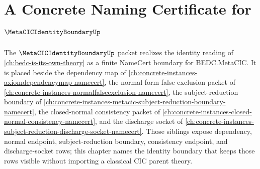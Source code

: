 \chapter{A Concrete Naming Certificate for $\MetaCICIdentityBoundaryUp$}
\label{ch:concrete-instances-metacicidentityboundary-namecert}

The $\MetaCICIdentityBoundaryUp$ packet realizes the identity reading of \autoref{ch:bedc-is-its-own-theory} as a finite NameCert boundary for BEDC.MetaCIC. It is placed beside the dependency map of \autoref{ch:concrete-instances-axiomdependencymap-namecert}, the normal-form false exclusion packet of \autoref{ch:concrete-instances-normalfalseexclusion-namecert}, the subject-reduction boundary of \autoref{ch:concrete-instances-metacic-subject-reduction-boundary-namecert}, the closed-normal consistency packet of \autoref{ch:concrete-instances-closed-normal-consistency-namecert}, and the discharge socket of \autoref{ch:concrete-instances-subject-reduction-discharge-socket-namecert}. Those siblings expose dependency, normal endpoint, subject-reduction boundary, consistency endpoint, and discharge-socket rows; this chapter names the identity boundary that keeps those rows visible without importing a classical CIC parent theory.

